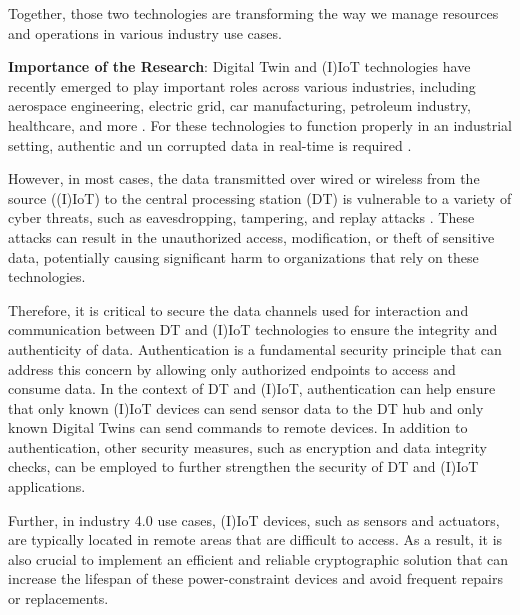 Together, those two technologies are transforming the way we manage resources and operations in various industry use cases.


\textbf{Importance of the Research}:
Digital Twin and (I)IoT technologies have recently emerged to play important roles across various industries, including aerospace engineering, electric grid, car manufacturing, petroleum industry, healthcare, and more \cite{tao_digital_2019}. For these technologies to function properly in an industrial setting, authentic and un corrupted data \cite{fuller_digital_2020} in real-time is required \cite{yuchenziqianzhangningtangApplicationDigitalTwin2022}. 

However, in most cases, the data transmitted over wired or wireless from the source ((I)IoT) to the central processing station (DT) is vulnerable to a variety of cyber threats, such as eavesdropping, tampering, and replay attacks \cite{hussainiTaxonomySecurityDefense2022}. These attacks can result in the unauthorized access, modification, or theft of sensitive data, potentially causing significant harm to organizations that rely on these technologies.

Therefore, it is critical to secure the data channels used for interaction and communication between DT  and (I)IoT technologies to ensure the integrity and authenticity of data. Authentication is a fundamental security principle that can address this concern by allowing only authorized endpoints to access and consume data. In the context of DT and (I)IoT, authentication can help ensure that only known (I)IoT devices can send sensor data to the DT hub and only known Digital Twins can send commands to remote devices. In addition to authentication, other security measures, such as encryption and data integrity checks, can be employed to further strengthen the security of DT and (I)IoT applications.

Further, in industry 4.0 use cases, (I)IoT devices, such as sensors and actuators, are typically located in remote areas that are difficult to access. As a result, it is also crucial to implement an efficient and reliable cryptographic solution that can increase the lifespan of these power-constraint devices and avoid frequent repairs or replacements.     


